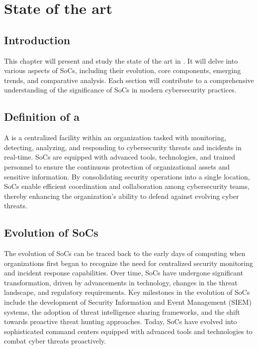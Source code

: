 \chapter{State of the art}
\minitoc
\newpage

\setcounter{secnumdepth}{0} %
\section{Introduction}
This chapter will present and study the state of the art in .
It will delve into various aspects of SoCs, including their evolution, core components, emerging trends, and comparative analysis.
Each section will contribute to a comprehensive understanding of the significance of SoCs in modern cybersecurity practices.

\setcounter{secnumdepth}{2} %
\section{Definition of a }
A  is a centralized facility within an organization tasked with monitoring, detecting, analyzing, and responding to cybersecurity threats and incidents in real-time.
SoCs are equipped with advanced tools, technologies, and trained personnel to ensure the continuous protection of organizational assets and sensitive information.
By consolidating security operations into a single location, SoCs enable efficient coordination and collaboration among cybersecurity teams, thereby enhancing the organization's ability to defend against evolving cyber threats.

\section{Evolution of SoCs}
The evolution of SoCs can be traced back to the early days of computing when organizations first began to recognize the need for centralized security monitoring and incident response capabilities.
Over time, SoCs have undergone significant transformation, driven by advancements in technology, changes in the threat landscape, and regulatory requirements.
Key milestones in the evolution of SoCs include the development of Security Information and Event Management (SIEM) systems, the adoption of threat intelligence sharing frameworks, and the shift towards proactive threat hunting approaches.
Today, SoCs have evolved into sophisticated command centers equipped with advanced tools and technologies to combat cyber threats proactively.


